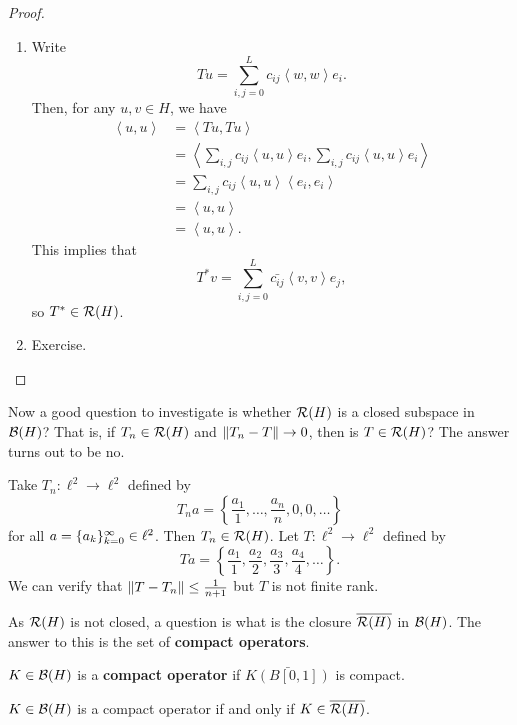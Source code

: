 \documentclass[a4paper]{article}
\renewcommand{\braket}[2]{\left\langle #1, #1 \right\rangle}
\begin{document}
\begin{proof}
\begin{enumerate}
  \item Write 
  \[
  T u = \sum_{i, j = 0}^L c_{ij} \braket{w}{e_j} e_i.
  \]
  Then, for any $u, v \in H$, we have 
  \[
  \begin{aligned}
    \braket{u}{T^* v} &= \braket{T u}{v}  \\
    &= \braket{\sum_{i, j} c_{ij} \braket{u}{e_j} e_i}{v} \\
    &= \sum_{i, j} c_{ij} \braket{u}{e_j} \braket{e_i}{v} \\ 
    &= \braket{u}{\sum_{i, j} \bar{c_{ij}} \bar{\braket{e_i}{v}} e_j} \\
    &= \braket{u}{\sum_{i, j} \bar{c_{ij}} \braket{v}{e_i} e_j}.
  \end{aligned}
  \]
  This implies that 
  \[
  T^* v = \sum_{i, j = 0}^L \bar{c_{ij}} \braket{v}{e_i} e_j,
  \]
  so $T^* \in \mathcal{R}(H)$.
  \item Exercise.
\end{enumerate}
\end{proof}

Now a good question to investigate is whether 
$\mathcal{R}(H)$ is a closed subspace in $\mathcal{B}(H)$?
That is, if $T_n \in \mathcal{R}(H)$ and $\left\lVert T_n - T\right\rVert \to 0$, 
then is $T \in \mathcal{R}(H)$? The answer turns out to be no. 

\begin{eg}
Take $T_n : \ell^2 \to \ell^2$ defined by 
\[
T_n a = \left\{ \frac{a_1}{1}, \dots, \frac{a_n}{n}, 0, 
0, \dots \right\}
\]
for all $a = \{ a_k \}_{k=0}^\infty \in \ell^2$. Then $T_n 
\in \mathcal{R}(H)$. Let $T : \ell^2 \to \ell^2$ defined 
by 
\[
T a = \left\{ \frac{a_1}{1}, \frac{a_2}{2}, 
\frac{a_3}{3}, \frac{a_4}{4}, \dots \right\}.
\]
We can verify that $\left\lVert T - T_n\right\rVert \leq \frac{1}{n + 1}$
but $T$ is not finite rank.
\end{eg}

As $\mathcal{R}(H)$ is not closed, a question is what is 
the closure $\overline{\mathcal{R}(H)}$ in $\mathcal{B}(H)$. The answer to 
this is the set of \textbf{compact operators}. 

\begin{defi}
  $K \in \mathcal{B}(H)$ is a \textbf{compact operator}
  if $\bar{K(B[0, 1])}$ is compact.
\end{defi}

\begin{thm}
$K \in \mathcal{B}(H)$ is a compact operator if and only if 
$K \in \overline{\mathcal{R}(H)}$.
\end{thm}
\end{document}
